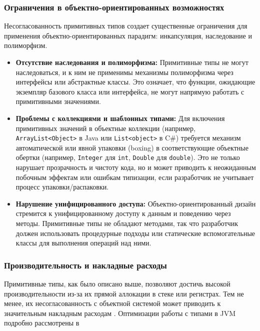 \subsubsection*{Ограничения в объектно-ориентированных возможностях}
Несогласованность примитивных типов создает существенные ограничения для применения объектно-ориентированных парадигм: инкапсуляция, наследование и полиморфизм.

\begin{itemize}
    \item \textbf{Отсутствие наследования и полиморфизма:} Примитивные типы не могут наследоваться, и к ним не применимы механизмы полиморфизма через интерфейсы или абстрактные классы. Это означает, что функции, ожидающие экземпляр базового класса или интерфейса, не могут напрямую работать с примитивными значениями.

    \item \textbf{Проблемы с коллекциями и шаблонных типами:} Для включения примитивных значений в объектные коллекции (например, \texttt{ArrayList<Object>} в Java или \texttt{List<object>} в C\#) требуется механизм автоматической или явной упаковки (boxing) в соответствующие объектные обертки (например, \texttt{Integer} для \texttt{int}, \texttt{Double} для \texttt{double}). Это не только нарушает прозрачность и чистоту кода, но и может приводить к неожиданным побочным эффектам или ошибкам типизации, если разработчик не учитывает процесс упаковки/распаковки.

    \item \textbf{Нарушение унифицированного доступа:} Объектно-ориентированный дизайн стремится к унифицированному доступу к данным и поведению через методы. Примитивные типы не обладают методами, так что разработчик должен использовать процедурные подходы или статические вспомогательные классы для выполнения операций над ними.
\end{itemize}

\subsubsection*{Производительность и накладные расходы}
\label{sec:performance}

Примитивные типы, как было описано выше, позволяют достичь высокой производительности из-за их прямой аллокации в стеке или регистрах. Тем не менее, их несогласованность с объектной системой может приводить к значительным накладным расходам \cite{chen2019}. Оптимизации работы с типами в JVM подробно рассмотрены в \cite{goetz2006}

